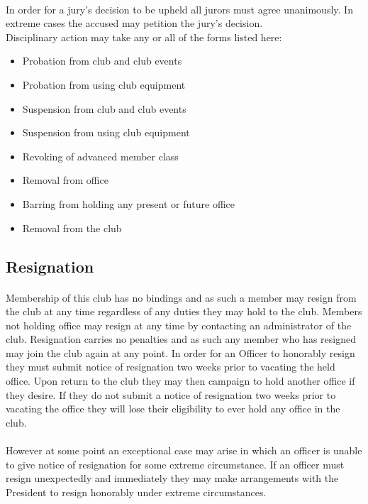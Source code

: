 \documentclass[12pt]{article}
\begin{document}
\paragraph{}
In order for a jury's decision to be upheld all jurors must agree unanimously. In extreme cases the accused may petition the jury's decision.  
\\
Disciplinary action may take any or all of the forms listed here:
\begin{itemize}
\item Probation from club and club events
\item Probation from using club equipment
\item Suspension from club and club events
\item Suspension from using club equipment
\item Revoking of advanced member class
\item Removal from office
\item Barring from holding any present or future office
\item Removal from the club
\end{itemize}

\subsection{Resignation}
\paragraph{}
Membership of this club has no bindings and as such a member may resign from the club at any time regardless of any duties they may hold to the club. Members not holding office may resign at any time by contacting an administrator of the club. Resignation carries no penalties and as such any member who has resigned may join the club again at any point. In order for an Officer to honorably resign they must submit notice of resignation two weeks prior to vacating the held office. Upon return to the club they may then campaign to hold another office if they desire. If they do not submit a notice of resignation two weeks prior to vacating the office they will lose their eligibility to ever hold any office in the club. 

\paragraph{}
However at some point an exceptional case may arise in which an officer is unable to give notice
of resignation for some extreme circumstance. If an officer must resign unexpectedly and immediately
they may make arrangements with the President to resign honorably under extreme circumstances.
\end{document}
